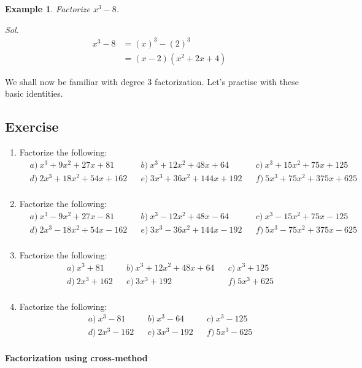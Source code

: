 \documentclass[12pt]{article}
\newtheorem{example}{Example}
\begin{document}
    \begin{example}
        Factorize $x^3-8$.
    \end{example}
    \textit{ Sol. }\begin{align*}
        x^3-8&=(x)^3-(2)^3\\
        &=(x-2)(x^2+2x+4)
    \end{align*}

    We shall now be familiar with degree 3 factorization. Let's practise with these basic identities.

    \subsection*{Exercise}
    \begin{enumerate}
        \item Factorize the following:\begin{align*}
            &a)\ x^3+9x^2+27x+81&&b)\ x^3+12x^2+48x+64&&c)\ x^3+15x^2+75x+125\\
            &d)\ 2x^3+18x^2+54x+162&&e)\ 3x^3+36x^2+144x+192&&f)\ 5x^3+75x^2+375x+625\\
        \end{align*}
        \item Factorize the following:\begin{align*}
            &a)\ x^3-9x^2+27x-81&&b)\ x^3-12x^2+48x-64&&c)\ x^3-15x^2+75x-125\\
            &d)\ 2x^3-18x^2+54x-162&&e)\ 3x^3-36x^2+144x-192&&f)\ 5x^3-75x^2+375x-625\\
        \end{align*}
        \item Factorize the following:\begin{align*}
            &a)\ x^3+81&&b)\ x^3+12x^2+48x+64&&c)\ x^3+125\\
            &d)\ 2x^3+162&&e)\ 3x^3+192&&f)\ 5x^3+625\\
        \end{align*}
        \item Factorize the following:\begin{align*}
            &a)\ x^3-81&&b)\ x^3-64&&c)\ x^3-125\\
            &d)\ 2x^3-162&&e)\ 3x^3-192&&f)\ 5x^3-625\\
        \end{align*}
    \end{enumerate}

    \begin{center}
        \textbf{Factorization using cross-method}
    \end{center}
\end{document}
